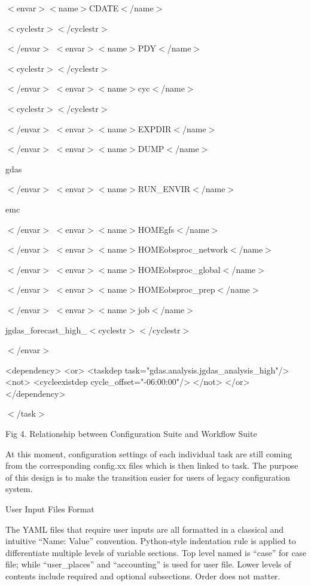 $<$envar$>$$<$name$>$C\-D\-A\-T\-E$<$/name$>$

$<$cyclestr$>$$<$/cyclestr$>$

$<$/envar$>$ $<$envar$>$$<$name$>$P\-D\-Y$<$/name$>$

$<$cyclestr$>$$<$/cyclestr$>$

$<$/envar$>$ $<$envar$>$$<$name$>$cyc$<$/name$>$

$<$cyclestr$>$$<$/cyclestr$>$

$<$/envar$>$ $<$envar$>$$<$name$>$E\-X\-P\-D\-I\-R$<$/name$>$

$<$/envar$>$ $<$envar$>$$<$name$>$D\-U\-M\-P$<$/name$>$

gdas

$<$/envar$>$ $<$envar$>$$<$name$>$R\-U\-N\-\_\-\-E\-N\-V\-I\-R$<$/name$>$

emc

$<$/envar$>$ $<$envar$>$$<$name$>$H\-O\-M\-Egfs$<$/name$>$

$<$/envar$>$ $<$envar$>$$<$name$>$H\-O\-M\-Eobsproc\-\_\-network$<$/name$>$

$<$/envar$>$ $<$envar$>$$<$name$>$H\-O\-M\-Eobsproc\-\_\-global$<$/name$>$

$<$/envar$>$ $<$envar$>$$<$name$>$H\-O\-M\-Eobsproc\-\_\-prep$<$/name$>$

$<$/envar$>$ $<$envar$>$$<$name$>$job$<$/name$>$

jgdas\-\_\-forecast\-\_\-high\-\_\-$<$cyclestr$>$$<$/cyclestr$>$

$<$/envar$>$

\begin{DoxyVerb}    <dependency>
          <or>
                <taskdep task="gdas.analysis.jgdas_analysis_high"/>
                <not>
                      <cycleexistdep cycle_offset="-06:00:00"/>
                </not>
          </or>
    </dependency>
\end{DoxyVerb}
 $<$/task$>$

Fig 4. Relationship between Configuration Suite and Workflow Suite

At this moment, configuration settings of each individual task are still coming from the corresponding config.\-xx files which is then linked to task. The purpose of this design is to make the transition easier for users of legacy configuration system.

User Input Files Format

The Y\-A\-M\-L files that require user inputs are all formatted in a classical and intuitive “\-Name\-: Value” convention. Python-\/style indentation rule is applied to differentiate multiple levels of variable sections. Top level named is “case” for case file; while “user\-\_\-places” and “accounting” is used for user file. Lower levels of contents include required and optional subsections. Order does not matter.

